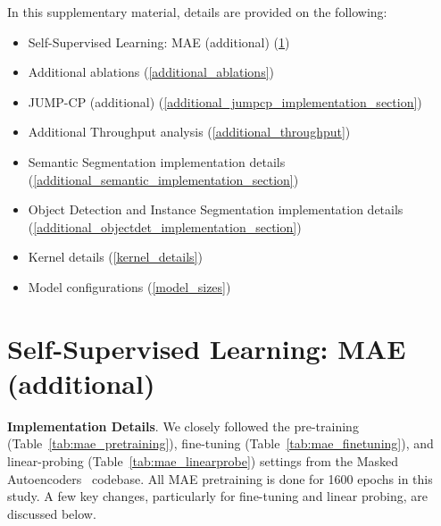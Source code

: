 In this supplementary material,  details are provided on the following: 
\begin{itemize}

    \item Self-Supervised Learning: MAE (additional) (\ref{additional_mae_section})

    \item Additional ablations 
    (\ref{additional_ablations})

    \item JUMP-CP (additional)  
    (\ref{additional_jumpcp_implementation_section})


    \item Additional Throughput analysis
    (\ref{additional_throughput})


    \item Semantic Segmentation implementation details  
    (\ref{additional_semantic_implementation_section})

    \item Object Detection and Instance Segmentation implementation details  
    (\ref{additional_objectdet_implementation_section})


    \item Kernel details
    (\ref{kernel_details})

    \item Model configurations
    (\ref{model_sizes})


\end{itemize}


\section{Self-Supervised Learning: MAE (additional)}
\label{additional_mae_section}

\noindent \textbf{Implementation Details}. We closely followed the pre-training (Table~\ref{tab:mae_pretraining}), fine-tuning (Table~\ref{tab:mae_finetuning}), and linear-probing (Table~\ref{tab:mae_linearprobe}) settings from the Masked Autoencoders~\cite{mae} codebase. All MAE pretraining is done for 1600 epochs in this study. A few key changes, particularly for fine-tuning and linear probing, are discussed below.

